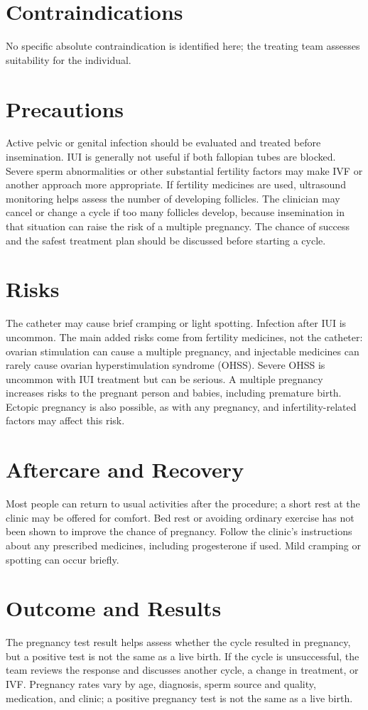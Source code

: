 \section*{Contraindications}
No specific absolute contraindication is identified here; the treating team assesses suitability for the individual.

\section*{Precautions}
Active pelvic or genital infection should be evaluated and treated before insemination. IUI is generally not useful if both fallopian tubes are blocked. Severe sperm abnormalities or other substantial fertility factors may make IVF or another approach more appropriate. If fertility medicines are used, ultrasound monitoring helps assess the number of developing follicles. The clinician may cancel or change a cycle if too many follicles develop, because insemination in that situation can raise the risk of a multiple pregnancy. The chance of success and the safest treatment plan should be discussed before starting a cycle.

\section*{Risks}
The catheter may cause brief cramping or light spotting. Infection after IUI is uncommon. The main added risks come from fertility medicines, not the catheter: ovarian stimulation can cause a multiple pregnancy, and injectable medicines can rarely cause ovarian hyperstimulation syndrome (OHSS). Severe OHSS is uncommon with IUI treatment but can be serious. A multiple pregnancy increases risks to the pregnant person and babies, including premature birth. Ectopic pregnancy is also possible, as with any pregnancy, and infertility-related factors may affect this risk.

\section*{Aftercare and Recovery}
Most people can return to usual activities after the procedure; a short rest at the clinic may be offered for comfort. Bed rest or avoiding ordinary exercise has not been shown to improve the chance of pregnancy. Follow the clinic's instructions about any prescribed medicines, including progesterone if used. Mild cramping or spotting can occur briefly.

\section*{Outcome and Results}
The pregnancy test result helps assess whether the cycle resulted in pregnancy, but a positive test is not the same as a live birth. If the cycle is unsuccessful, the team reviews the response and discusses another cycle, a change in treatment, or IVF. Pregnancy rates vary by age, diagnosis, sperm source and quality, medication, and clinic; a positive pregnancy test is not the same as a live birth.

